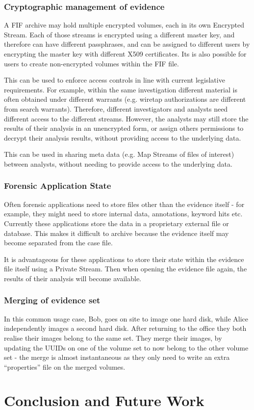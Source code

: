 \documentclass[10pt, conference]{IEEEtran}
\begin{document}
\subsubsection{Cryptographic management of evidence}
A FIF archive may hold multiple encrypted volumes, each in its own
Encrypted Stream. Each of those streams is encrypted using a different
master key, and therefore can have different passphrases, and can be
assigned to different users by encrypting the master key with
different X509 certificates. Its is also possible for users to create
non-encrypted volumes within the FIF file.

This can be used to enforce access controls in line with current
legislative requirements. For example, within the same investigation
different material is often obtained under different warrants
(e.g. wiretap authorizations are different from search
warrants). Therefore, different investigators and analysts need
different access to the different streams. However, the analysts may
still store the results of their analysis in an unencrypted form, or
assign others permissions to decrypt their analysis results, without
providing access to the underlying data. 

This can be used in sharing meta data (e.g. Map Streams of files of
interest) between analysts, without needing to provide access to the
underlying data.

\subsubsection{Forensic Application State}
Often forensic applications need to store files other than the
evidence itself - for example, they might need to store internal data,
annotations, keyword hits etc. Currently these applications store the
data in a proprietary external file or database. This makes it
difficult to archive because the evidence itself may become separated
from the case file.

It is advantageous for these applications to store their state within
the evidence file itself using a Private Stream. Then when opening the
evidence file again, the results of their analysis will become
available.

\subsubsection{Merging of evidence set}
In this common usage case, Bob, goes on site to image one hard disk,
while Alice independently images a second hard disk. After returning
to the office they both realise their images belong to the same
set. They merge their images, by updating the UUIDs on one of the
volume set to now belong to the other volume set - the merge is almost
instantaneous as they only need to write an extra ``properties'' file
on the merged volumes.

\section{Conclusion and Future Work}


\end{document}
